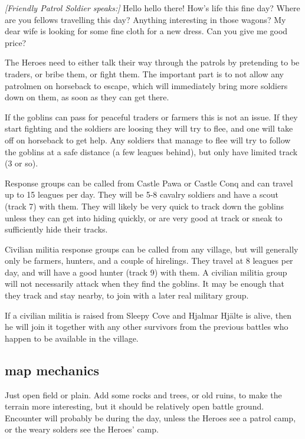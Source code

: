 \begin{readoutloud}
\emph{[Friendly Patrol Soldier speaks:]}
Hello hello there! How's life this fine day? Where are you fellows travelling this day? Anything interesting in those wagons? My dear wife is looking for some fine cloth for a new dress. Can you give me good price?
\end{readoutloud}

The Heroes need to either talk their way through the patrols by pretending to be traders, or bribe them, or fight them. The important part is to not allow any patrolmen on horseback to escape, which will immediately bring more soldiers down on them, as soon as they can get there.

If the goblins can pass for peaceful traders or farmers this is not an issue. If they start fighting and the soldiers are loosing they will try to flee, and one will take off on horseback to get help. Any soldiers that manage to flee will try to follow the goblins at a safe distance (a few leagues behind), but only have limited track (3 or so).

Response groups can be called from Castle Pawa or Castle Conq and can travel up to 15 leagues per day. They will be 5-8 cavalry soldiers and have a scout (track 7) with them. They will likely be very quick to track down the goblins unless they can get into hiding quickly, or are very good at track or sneak to sufficiently hide their tracks.

Civilian militia response groups can be called from any village, but will generally only be farmers, hunters, and a couple of hirelings. They travel at 8 leagues per day, and will have a good hunter (track 9) with them. A civilian militia group will not necessarily attack when they find the goblins. It may be enough that they track and stay nearby, to join with a later real military group.

If a civilian militia is raised from Sleepy Cove and Hjalmar Hjälte is alive, then he will join it together with any other survivors from the previous battles who happen to be available in the village.


\subsection*{map mechanics}

Just open field or plain. Add some rocks and trees, or old ruins, to make the terrain more interesting, but it should be relatively open battle ground.
Encounter will probably be during the day, unless the Heroes see a patrol camp, or the weary solders see the Heroes' camp.


